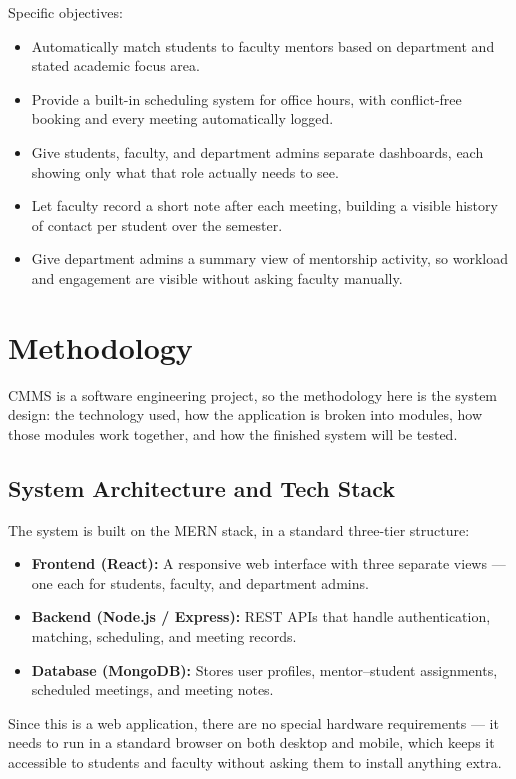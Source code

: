 \documentclass[11pt]{article}
\begin{document}
Specific objectives:
\begin{itemize}[leftmargin=1.4em, itemsep=0.2em]
  \item Automatically match students to faculty mentors based on department and stated academic focus area.
  \item Provide a built-in scheduling system for office hours, with conflict-free booking and every meeting automatically logged.
  \item Give students, faculty, and department admins separate dashboards, each showing only what that role actually needs to see.
  \item Let faculty record a short note after each meeting, building a visible history of contact per student over the semester.
  \item Give department admins a summary view of mentorship activity, so workload and engagement are visible without asking faculty manually.
\end{itemize}

\section{Methodology}
CMMS is a software engineering project, so the methodology here is the system design: the technology used, how the application is broken into modules, how those modules work together, and how the finished system will be tested.

\subsection{System Architecture and Tech Stack}
The system is built on the MERN stack, in a standard three-tier structure:
\begin{itemize}[leftmargin=1.4em, itemsep=0.2em]
  \item \textbf{Frontend (React):} A responsive web interface with three separate views --- one each for students, faculty, and department admins.
  \item \textbf{Backend (Node.js / Express):} REST APIs that handle authentication, matching, scheduling, and meeting records.
  \item \textbf{Database (MongoDB):} Stores user profiles, mentor--student assignments, scheduled meetings, and meeting notes.
\end{itemize}
Since this is a web application, there are no special hardware requirements --- it needs to run in a standard browser on both desktop and mobile, which keeps it accessible to students and faculty without asking them to install anything extra.
\end{document}
